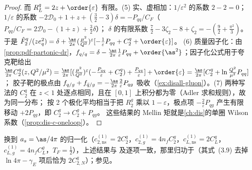 \begin{proof}
而 $R^q_L=2z+\order{\varepsilon}$ 有限。(5) 实、虚相加：$1/\varepsilon^2$ 的系数 $2-2=0$；$1/\varepsilon$ 的系数 $-2\mathcal D_0+1+z+(\frac32-3)\delta=-P_{qq}/C_F$（$P_{qq}/C_F=2\mathcal D_0-(1+z)+\frac32\delta$）；
$\delta$ 的有限系数 $\frac72-3\zeta_2-8+\zeta_2=-(\frac92+\frac{\pi^2}3)$。于是 $\hat F^q_2/(ze_q^2)=\delta+\frac{\as}{2\pi}(\frac{\mu^2}{Q^2})^\varepsilon[-\frac1\varepsilon P_{qq}+C_2^q+\order{\varepsilon}]$。   %
(6) 质量因子化：由\cref{prop:pdf-partonic-dr}，$f_{q/q}=\delta-\frac{\as}{2\pi}\frac1\varepsilon P_{qq}+\order{\as^2}$；因子化公式用于夸克靶给出
$\frac{\as}{2\pi}C_2^q(z,Q^2/\mu^2)=\frac{\as}{2\pi}[(\frac{\mu^2}{Q^2})^\varepsilon(-\frac{P_{qq}}\varepsilon+C_2^q)+\frac{P_{qq}}\varepsilon]+\order{\varepsilon}=\frac{\as}{2\pi}[C_2^q+\ln\frac{Q^2}{\mu^2}P_{qq}]$；
胶子靶的极点由 $f_{q/g}+f_{\bar q/g}=-\frac{\as}{2\pi}\frac2\varepsilon P_{qg}$ 吸收（\cref{ex:disall-gluon}）。(7) 两种写法的 $C_2^q$ 在 $z<1$ 处逐点相同，且在 $[0,1]$ 上积分都为零（Adler 求和规则），故为同一分布；
按 2 个极化平均相当于把 $R^g_2$ 乘以 $1-\varepsilon$，极点项 $-\frac2\varepsilon P_{qg}$ 产生有限移动 $+2P_{qg}$，即 $C_2^g\to C_2^g+P_{qg}$。   %
这些结果的 Mellin 矩就是\cref{ch:dis}的单圈 Wilson 系数（\cref{prop:dis-c-oneloop}）。
\end{proof}

\noindent
换到 $a_s=\as/4\pi$ 的归一化（$c^{(1)}_{2,\mathrm{ns}}=2C_2^q$，$c^{(1)}_{2,g}=4n_fC_2^g$，$c^{(1)}_{L,\mathrm{ns}}=2C_L^q$，$c^{(1)}_{L,g}=4n_fC_L^g$，$T_F=\frac12$），上述结果与\cite[式~(4.1)--(4.4)、(B.3)--(B.4)]{Vermaseren:2005qc}
及\cite[式~(3)]{Moch:2004xu}逐项一致，那里归功于\cite{BardeenEtAl1978}（其式~(3.9) 去掉 $\ln4\pi-\gamma_E$ 项后恰为 $2C^q_{2,N}$）；参见\cite{FurmanskiPetronzio1982,EllisStirlingWebber1996}。

